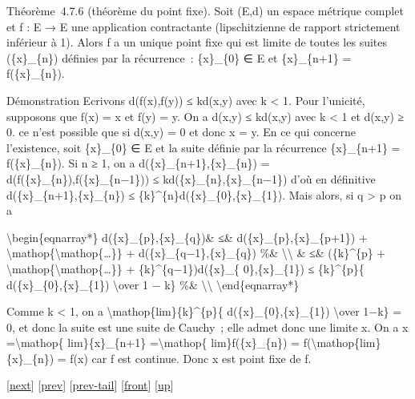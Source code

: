 \documentclass[]{article}
\begin{document}
Théorème~4.7.6 (théorème du point fixe). Soit (E,d) un espace métrique
complet et f : E → E une application contractante (lipschitzienne de
rapport strictement inférieur à 1). Alors f a un unique point fixe qui
est limite de toutes les suites (\{x\}\_\{n\}) définies par la
récurrence~: \{x\}\_\{0\} ∈ E et \{x\}\_\{n+1\} = f(\{x\}\_\{n\}).

Démonstration Ecrivons d(f(x),f(y)) ≤ kd(x,y) avec k \textless{} 1. Pour
l'unicité, supposons que f(x) = x et f(y) = y. On a d(x,y) ≤ kd(x,y)
avec k \textless{} 1 et d(x,y) ≥ 0. ce n'est possible que si d(x,y) = 0
et donc x = y. En ce qui concerne l'existence, soit \{x\}\_\{0\} ∈ E et
la suite définie par la récurrence \{x\}\_\{n+1\} = f(\{x\}\_\{n\}). Si
n ≥ 1, on a d(\{x\}\_\{n+1\},\{x\}\_\{n\}) =
d(f(\{x\}\_\{n\}),f(\{x\}\_\{n−1\})) ≤ kd(\{x\}\_\{n\},\{x\}\_\{n−1\})
d'où en définitive d(\{x\}\_\{n+1\},\{x\}\_\{n\}) ≤
\{k\}\^{}\{n\}d(\{x\}\_\{0\},\{x\}\_\{1\}). Mais alors, si q
\textgreater{} p on a

\textbackslash{}begin\{eqnarray*\} d(\{x\}\_\{p\},\{x\}\_\{q\})\& ≤\&
d(\{x\}\_\{p\},\{x\}\_\{p+1\}) +
\textbackslash{}mathop\{\textbackslash{}mathop\{\ldots{}\}\} +
d(\{x\}\_\{q−1\},\{x\}\_\{q\}) \%\& \textbackslash{}\textbackslash{} \&
≤\& (\{k\}\^{}\{p\} +
\textbackslash{}mathop\{\textbackslash{}mathop\{\ldots{}\}\} +
\{k\}\^{}\{q−1\})d(\{x\}\_\{ 0\},\{x\}\_\{1\}) ≤ \{k\}\^{}\{p\}\{
d(\{x\}\_\{0\},\{x\}\_\{1\}) \textbackslash{}over 1 − k\} \%\&
\textbackslash{}\textbackslash{} \textbackslash{}end\{eqnarray*\}

Comme k \textless{} 1, on a
\textbackslash{}mathop\{lim\}\{k\}\^{}\{p\}\{
d(\{x\}\_\{0\},\{x\}\_\{1\}) \textbackslash{}over 1−k\} = 0, et donc la
suite est une suite de Cauchy~; elle admet donc une limite x. On a x
=\textbackslash{}mathop\{ lim\}\{x\}\_\{n+1\} =\textbackslash{}mathop\{
lim\}f(\{x\}\_\{n\}) = f(\textbackslash{}mathop\{lim\}\{x\}\_\{n\}) =
f(x) car f est continue. Donc x est point fixe de f.

{[}\href{coursse25.html}{next}{]} {[}\href{coursse23.html}{prev}{]}
{[}\href{coursse23.html\#tailcoursse23.html}{prev-tail}{]}
{[}\href{coursse24.html}{front}{]}
{[}\href{coursch5.html\#coursse24.html}{up}{]}
\end{document}
